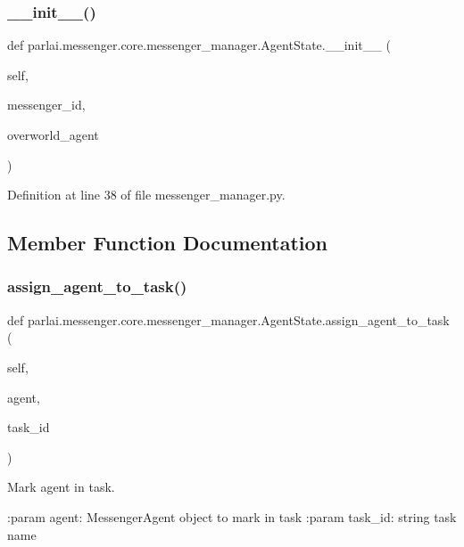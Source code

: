 \subsubsection{\texorpdfstring{\+\_\+\+\_\+init\+\_\+\+\_\+()}{\_\_init\_\_()}}
{\footnotesize\ttfamily def parlai.\+messenger.\+core.\+messenger\+\_\+manager.\+Agent\+State.\+\_\+\+\_\+init\+\_\+\+\_\+ (\begin{DoxyParamCaption}\item[{}]{self,  }\item[{}]{messenger\+\_\+id,  }\item[{}]{overworld\+\_\+agent }\end{DoxyParamCaption})}



Definition at line 38 of file messenger\+\_\+manager.\+py.



\subsection{Member Function Documentation}
\mbox{\label{classparlai_1_1messenger_1_1core_1_1messenger__manager_1_1AgentState_af5d5fb350629667f893337d4043143af}} 
\subsubsection{\texorpdfstring{assign\+\_\+agent\+\_\+to\+\_\+task()}{assign\_agent\_to\_task()}}
{\footnotesize\ttfamily def parlai.\+messenger.\+core.\+messenger\+\_\+manager.\+Agent\+State.\+assign\+\_\+agent\+\_\+to\+\_\+task (\begin{DoxyParamCaption}\item[{}]{self,  }\item[{}]{agent,  }\item[{}]{task\+\_\+id }\end{DoxyParamCaption})}

\begin{DoxyVerb}Mark agent in task.

:param agent:
    MessengerAgent object to mark in task
:param task_id:
    string task name
\end{DoxyVerb}
 

